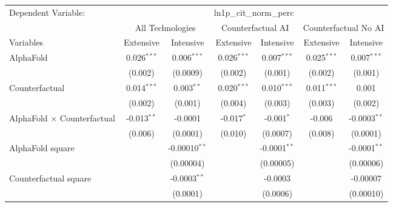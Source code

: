 \begingroup
\centering
\begin{tabular}{lcccccc}
   \tabularnewline \midrule \midrule
   Dependent Variable: & \multicolumn{6}{c}{ln1p\_cit\_norm\_perc}\\
 & \multicolumn{2}{c}{All Technologies} & \multicolumn{2}{c}{Counterfactual AI} & \multicolumn{2}{c}{Counterfactual No AI} \\
\cmidrule(lr){1-1}\cmidrule(lr){2-3} \cmidrule(lr){4-5} \cmidrule(lr){6-7}
Variables & \multicolumn{1}{c}{Extensive} & \multicolumn{1}{c}{Intensive} & \multicolumn{1}{c}{Extensive} & \multicolumn{1}{c}{Intensive} & \multicolumn{1}{c}{Extensive} & \multicolumn{1}{c}{Intensive} \\
\cmidrule(lr){1-1}\cmidrule(lr){2-2} \cmidrule(lr){3-3} \cmidrule(lr){4-4} \cmidrule(lr){5-5} \cmidrule(lr){6-6} \cmidrule(lr){7-7}
   AlphaFold                          & 0.026$^{***}$ & 0.006$^{***}$      & 0.026$^{***}$ & 0.007$^{***}$  & 0.025$^{***}$ & 0.007$^{***}$\\   
                                      & (0.002)       & (0.0009)           & (0.002)       & (0.001)        & (0.002)       & (0.001)\\   
   Counterfactual                     & 0.014$^{***}$ & 0.003$^{**}$       & 0.020$^{***}$ & 0.010$^{***}$  & 0.011$^{***}$ & 0.001\\   
                                      & (0.002)       & (0.001)            & (0.004)       & (0.003)        & (0.003)       & (0.002)\\   
   AlphaFold $\times$ Counterfactual  & -0.013$^{**}$ & -0.0001            & -0.017$^{*}$  & -0.001$^{*}$   & -0.006        & -0.0003$^{**}$\\   
                                      & (0.006)       & (0.0001)           & (0.010)       & (0.0007)       & (0.008)       & (0.0001)\\   
   AlphaFold square                   &               & -0.00010$^{**}$    &               & -0.0001$^{**}$ &               & -0.0001$^{**}$\\   
                                      &               & (0.00004)          &               & (0.00005)      &               & (0.00006)\\   
   Counterfactual square              &               & -0.0003$^{**}$     &               & -0.0003        &               & -0.00007\\   
                                      &               & (0.0001)           &               & (0.0006)       &               & (0.00010)\\   

\end{tabular}
